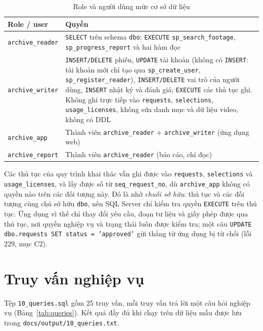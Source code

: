 \begin{table}[H]
\centering
\caption{Role và người dùng mức cơ sở dữ liệu}
\label{tab:db_roles}
\renewcommand{\arraystretch}{1.15}
\begin{tabularx}{\textwidth}{>{\raggedright\arraybackslash}p{2.6cm} >{\raggedright\arraybackslash}X}
\toprule
\textbf{Role / user} & \textbf{Quyền} \\
\midrule
\texttt{archive\_reader} & \texttt{SELECT} trên schema \texttt{dbo}; \texttt{EXECUTE} \texttt{sp\_search\_footage}, \texttt{sp\_progress\_report} và hai hàm đọc \\
\texttt{archive\_writer} & \texttt{INSERT/DELETE} phiên, \texttt{UPDATE} tài khoản (không có \texttt{INSERT}: tài khoản mới chỉ tạo qua \texttt{sp\_create\_user}, \texttt{sp\_register\_reader}), \texttt{INSERT/DELETE} vai trò của người dùng, \texttt{INSERT} nhật ký và đánh giá; \texttt{EXECUTE} các thủ tục ghi. Không ghi trực tiếp vào \texttt{requests}, \texttt{selections}, \texttt{usage\_licenses}, không sửa danh mục và dữ liệu video, không có DDL \\
\texttt{archive\_app} & Thành viên \texttt{archive\_reader} + \texttt{archive\_writer} (ứng dụng web) \\
\texttt{archive\_report} & Thành viên \texttt{archive\_reader} (báo cáo, chỉ đọc) \\
\bottomrule
\end{tabularx}
\end{table}

Các thủ tục của quy trình khai thác vẫn ghi được vào \texttt{requests}, \texttt{selections}
và \texttt{usage\_licenses}, và lấy được số từ \texttt{seq\_request\_no}, dù \texttt{archive\_app}
không có quyền nào trên các đối tượng này. Đó là nhờ \textit{chuỗi sở hữu}: thủ tục và các
đối tượng cùng chủ sở hữu \texttt{dbo}, nên SQL Server chỉ kiểm tra quyền \texttt{EXECUTE}
trên thủ tục. Ứng dụng vì thế chỉ thay đổi yêu cầu, đoạn tư liệu và giấy phép được qua thủ
tục, nơi quyền nghiệp vụ và trạng thái luôn được kiểm tra; một câu
\texttt{UPDATE dbo.requests SET status = 'approved'} gửi thẳng từ ứng dụng bị từ chối
(lỗi 229, mục C2).

\section{Truy vấn nghiệp vụ}

Tệp \texttt{10\_queries.sql} gồm 25 truy vấn, mỗi truy vấn trả lời một câu hỏi nghiệp vụ
(Bảng~\ref{tab:queries}). Kết quả đầy đủ khi chạy trên dữ liệu mẫu được lưu trong
\texttt{docs/output/10\_queries.txt}.

